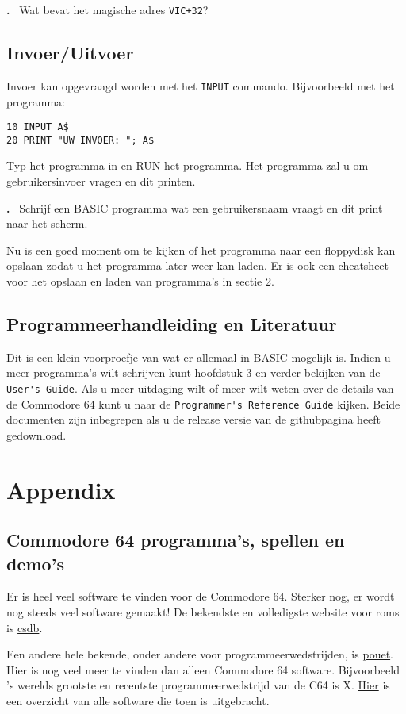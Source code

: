 \documentclass{article}
\newcounter{problem}
\newcounter{solution}
\newcommand\problem{%
  \stepcounter{problem}%
  \textbf{\theproblem.}~%
  \setcounter{solution}{0}%
}
\begin{document}
\problem Wat bevat het magische adres \verb:VIC+32:?

\subsection{Invoer/Uitvoer}

Invoer kan opgevraagd worden met het \verb:INPUT: commando.
Bijvoorbeeld met het programma:

\begin{lstlisting}
10 INPUT A$
20 PRINT "UW INVOER: "; A$
\end{lstlisting}

Typ het programma in en RUN het programma.
Het programma zal u om gebruikersinvoer vragen en dit printen.

\problem Schrijf een BASIC programma wat een gebruikersnaam vraagt en dit print naar het scherm.

Nu is een goed moment om te kijken of het programma naar een floppydisk kan opslaan zodat u het programma later weer kan laden.
Er is ook een cheatsheet voor het opslaan en laden van programma's in sectie 2.

\subsection{Programmeerhandleiding en Literatuur}

Dit is een klein voorproefje van wat er allemaal in BASIC mogelijk is.
Indien u meer programma's wilt schrijven kunt hoofdstuk 3 en verder bekijken van de \verb:User's Guide:.
Als u meer uitdaging wilt of meer wilt weten over de details van de Commodore 64 kunt u naar de \verb:Programmer's Reference Guide: kijken.
Beide documenten zijn inbegrepen als u de release versie van de githubpagina heeft gedownload.

\section{Appendix}

\subsection{Commodore 64 programma's, spellen en demo's}

Er is heel veel software te vinden voor de Commodore 64.
Sterker nog, er wordt nog steeds veel software gemaakt!
De bekendste en volledigste website voor roms is \href{http://csdb.dk}{csdb}.

Een andere hele bekende, onder andere voor programmeerwedstrijden, is \href{https://www.pouet.net}{pouet}.
Hier is nog veel meer te vinden dan alleen Commodore 64 software.
Bijvoorbeeld 's werelds grootste en recentste programmeerwedstrijd van de C64 is X.
\href{https://www.pouet.net/party.php?which=50&when=2016}{Hier} is een overzicht van alle software die toen is uitgebracht.
\end{document}

